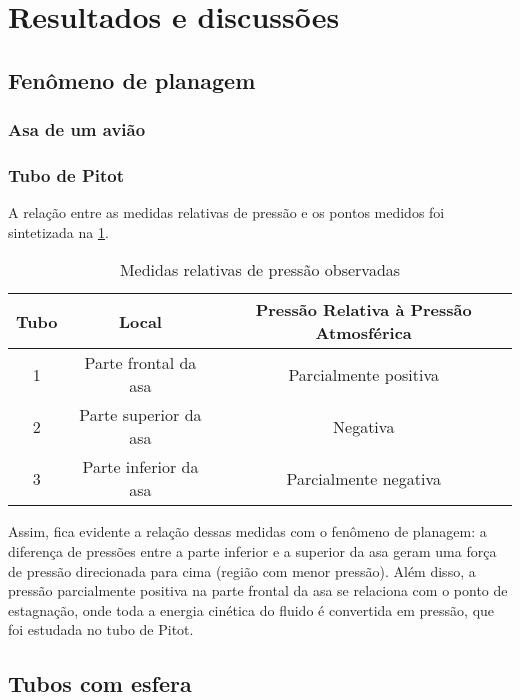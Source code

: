 \section{Resultados e discussões}

\subsection{Fenômeno de planagem}
\subsubsection{Asa de um avião}

\subsubsection{Tubo de Pitot}
    A relação entre as medidas relativas de pressão e os pontos medidos foi
    sintetizada na \cref{erapraserumquadro-sequiserarrumevc}.
    \begin{table}[H]
    \caption{Medidas relativas de pressão observadas}\label{erapraserumquadro-sequiserarrumevc}
    \begin{center}
    \begin{tabular}{c c c}
    \hline
    Tubo & Local & Pressão Relativa à Pressão Atmosférica \\
    \hline
    1    & Parte frontal da asa & Parcialmente positiva\\
    2    & Parte superior da asa & Negativa\\
    3    & Parte inferior da asa & Parcialmente negativa\\
    \hline
    \end{tabular}
    \end{center}
    \end{table}
    Assim, fica evidente a relação dessas medidas com o fenômeno de planagem: a
    diferença de pressões entre a parte inferior e a superior da asa geram uma
    força de pressão direcionada para cima (região com menor pressão). Além
    disso, a pressão parcialmente positiva na parte frontal da asa se relaciona
    com o ponto de estagnação, onde toda a energia cinética do fluido é
    convertida em pressão, que foi estudada no tubo de Pitot.

\subsection{Tubos com esfera}
